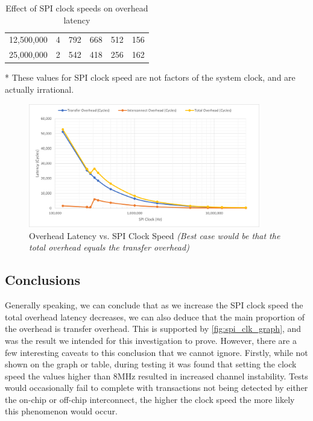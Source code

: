 \begin{table}
\begin{threeparttable}
\begin{tabular}{l|l|l|l|l|l}
     12,500,000            &  4                   &  792                 &  668                 & 512                   &  156                                        \\
     25,000,000            &  2                   &  542                 &  418                 & 256                   &  162                                       
    \end{tabular}
    \begin{tablenotes}\footnotesize
        \item[*] These values for SPI clock speed are not factors of the system clock, and are actually irrational.
        \end{tablenotes}
    \end{threeparttable}
    \caption{Effect of SPI clock speeds on overhead latency}
    \label{tbl:spi_clk_results}
\end{table}

\begin{figure}[!htb]
    \centering
    \includegraphics[width=0.9\textwidth]{05_evaluation/images/overhead_vs_spi_clk.png}
    \caption{Overhead Latency vs. SPI Clock Speed \textit{(Best case would be that the total overhead equals the transfer overhead)}} 
    \label{fig:spi_clk_graph}
\end{figure}


\subsection{Conclusions}

Generally speaking, we can conclude that as we increase the SPI clock speed the total overhead latency decreases, we can also deduce that the main proportion of the overhead is transfer overhead. This is supported by \autoref{fig:spi_clk_graph}, and was the result we intended for this investigation to prove. However, there are a few interesting caveats to this conclusion that we cannot ignore. Firstly, while not shown on the graph or table, during testing it was found that setting the clock speed the values higher than 8MHz resulted in increased channel instability. Tests would occasionally fail to complete with transactions not being detected by either the on-chip or off-chip interconnect, the higher the clock speed the more likely this phenomenon would occur.

